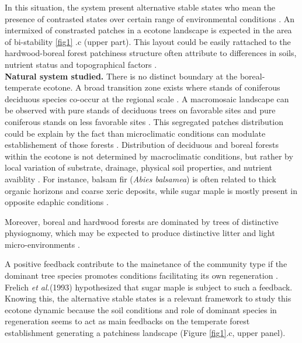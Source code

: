 
In this situation, the system present alternative stable states who mean the
presence of contrasted states over certain range of environmental conditions
\cite{scheffer2009critical}. An intermixed of constrasted patches in a ecotone
landscape is expected in the area of bi-stability \ref{fig1} .c (upper part).
This layout could be easily rattached to the hardwood-boreal forest patchiness
structure often attribute to differences in soils, nutrient status and
topographical factors \cite{Society2014}.\\


\textbf{Natural system studied.} There is no distinct boundary at the boreal-
temperate ecotone. A broad transition zone exists where stands of coniferous
deciduous species co-occur at the regional scale \cite{Goldblum2010}. A
macromosaic landscape can be observed with pure stands of deciduous trees on
favorable sites and pure coniferous stands on less favorable sites
\cite{Goldblum2010}. This segregated patches distribution could be explain by
the fact than microclimatic conditions can modulate establishement of those
forests \cite{DeFrenne2013}. Distribution of deciduous and boreal forests
within the ecotone is not determined by macroclimatic conditions, but rather
by local variation of substrate, drainage, physical soil properties, and
nutrient avaiblity \cite{Goldblum2010,Society2014}.  For instance, balsam fir
(\textit{Abies balsamea}) is often related to thick organic horizons and
coarse xeric deposits, while sugar maple is mostly present in opposite edaphic
conditions \cite{Messaoud2007,Kellman2004,Barras1998}.


Moreover, boreal and hardwood forests are dominated by trees of distinctive
physiognomy, which may be expected to produce distinctive litter and light
micro-environments \cite{Barras1998}.


A positive feedback contribute to the mainetance of the community type if the
dominant tree species promotes conditions facilitating its own regeneration
\cite{Barras1998}. Frelich \textit{et al.}(1993) \cite{Society2014}
hypothesized that sugar maple is subject to such a feedback.  Knowing this,
the alternative stable states is a relevant framework to study this ecotone
dynamic because the soil conditions and role of dominant species in
regeneration seems to act as main feedbacks on the temperate forest
establishment generating a patchiness landscape (Figure \ref{fig1}.c, upper
panel).

